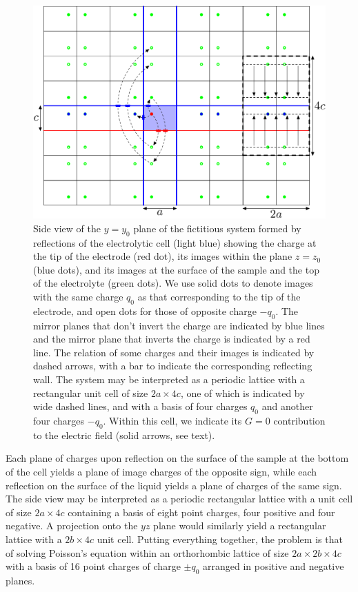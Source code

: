 \documentclass[review,sort&compress]{cas-sc}
\begin{document}
\begin{figure}
  \centering
  \includegraphics[width=\textwidth]{fig3}
  \caption{Side view of the $y=y_0$ plane of the fictitious system formed by reflections of
    the electrolytic cell (light blue)
    showing the charge at the tip of the electrode (red dot), its
    images within the plane $z=z_0$ (blue dots), and its images at the
    surface of the sample and the top of the electrolyte (green
    dots). We use solid dots to denote images with the same charge $q_0$
    as that corresponding to the tip of the electrode, and open dots for those of
    opposite charge $-q_0$. The mirror planes that don't invert the charge
    are indicated by blue lines and the mirror plane that inverts the
    charge is indicated by a red line. The relation of some charges and their images is
    indicated by dashed arrows, with a bar to indicate the
    corresponding reflecting wall. The system may be interpreted as a periodic
    lattice with a rectangular unit cell of size $2a\times 4c$, one of
    which is indicated by wide dashed lines, and with a basis of four
    charges $q_0$ and another four charges $-q_0$. Within this cell,
    we indicate its $G=0$ contribution to the electric field (solid
    arrows, see text).}
  \label{fig:sideview}
\end{figure}
Each plane of charges upon reflection on the surface of the sample at
the bottom of the cell yields a
plane of image charges of the opposite sign, while each reflection
on the surface of the liquid yields a plane of charges of the same
sign. The side view may be interpreted as a periodic rectangular
lattice with a unit cell of size $2a\times 4c$ containing a basis of eight point
charges, four positive and four negative. A projection onto the $yz$
plane would similarly yield a rectangular lattice with a  $2b\times4c$
unit cell. Putting everything together, the problem is that of solving
Poisson's equation within an orthorhombic lattice of size
$2a\times2b\times4c$ with a basis of 16 point charges of charge $\pm
q_0$ arranged in positive and negative planes.
\end{document}

